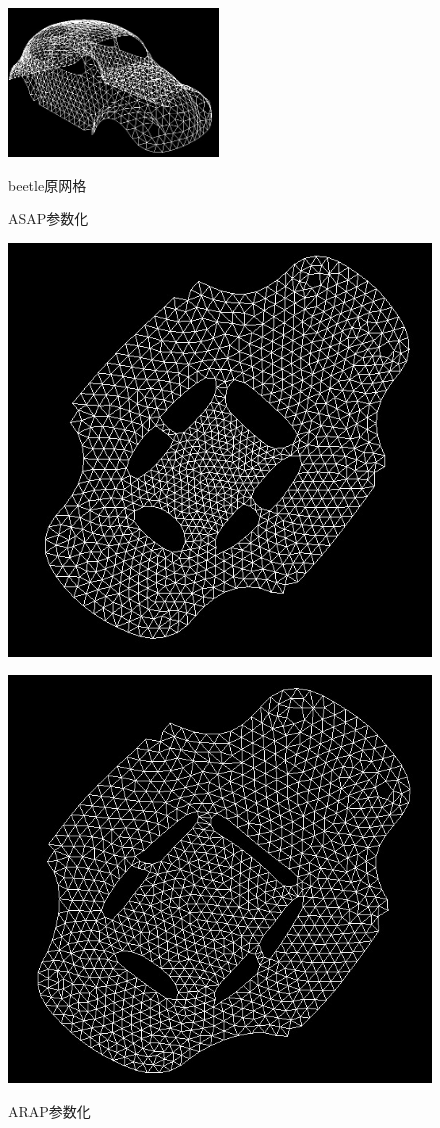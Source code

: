 \documentclass{article}
\begin{document}
	\begin{figure}[htb]
		\caption{\label{table.label} beetle原网格} \centering
		\begin{center}
			\includegraphics[width=2.2in]{beetle.jpg}
			\label{figure.label}
		\end{center}
	\end{figure}
	\begin{figure}[htbp]
		\centering
		\begin{minipage}{0.49\linewidth}
			\centering
			\caption{ASAP参数化}
			\includegraphics[width=0.8\linewidth]{beetle_asap.JPG}
			\label{chutian2}%
		\end{minipage}
		\begin{minipage}{0.49\linewidth}
			\centering
			\caption{ARAP参数化}
			\includegraphics[width=0.8\linewidth]{beetle_arap.JPG}
			\label{chutian2}%
		\end{minipage}
	\end{figure}
\end{document}
